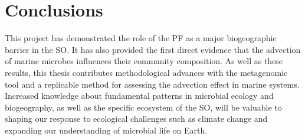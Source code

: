 \section{Conclusions}
This project has demonstrated the role of the \ac{PF} as a major biogeographic barrier in the \ac{SO}.
It has also provided the first direct evidence that the advection of marine microbes influences their community composition.
As well as these results, this thesis contributes methodological advances with the metagenomic tool  and a replicable method for assessing the advection effect in marine systems.
Increased knowledge about fundamental patterns in microbial ecology and biogeography, as well as the specific ecosystem of the \ac{SO}, will be valuable to shaping our response to ecological challenges such as climate change and expanding our understanding of microbial life on Earth.
